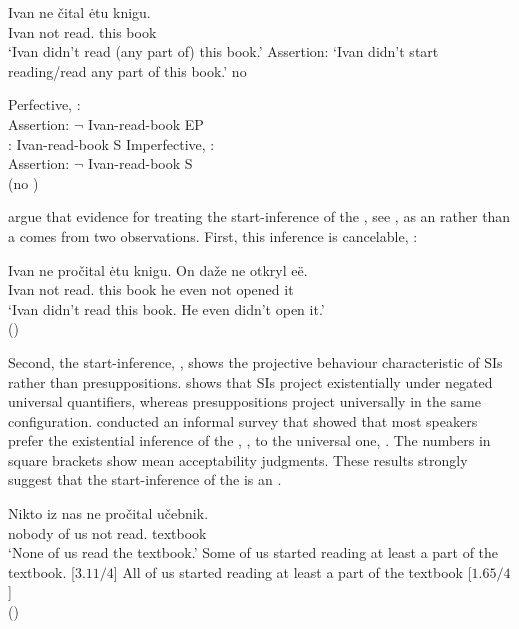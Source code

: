 \documentclass[output=paper,newtxmath,colorlinks,citecolor=brown]{langsci/langscibook}
\begin{document}
 \ea \label{ipfv} \ea \gll Ivan ne čital ėtu knigu. \\
    	Ivan not {read.\im} this book \\
        \glt `Ivan  didn't read (any part of) this book.'
 		\ex  Assertion: `Ivan didn't start reading/read any part of this book.'
        \ex no 
        \z \z

	\ea \label{abbrasp} \ea Perfective, : \\
    	Assertion: $\neg$ Ivan-read-book EP \\
        : Ivan-read-book S
   \ex Imperfective, : \\
        Assertion: $\neg$ Ivan-read-book S \\
        (no )
	\z \z


\noindent \cite{zinfil14} argue that evidence for treating the start-inference of the , see , as an  rather than a  comes from two observations. First, this inference is cancelable, :

\ea \label{cancel} \gll Ivan ne pročital ėtu knigu. On da\v ze ne otkryl e\"e.  \\
    	Ivan not {read.\p} this book he even not opened it\\
       \glt  `Ivan  didn't read this book. He even didn't open it.' \\
        \hfill (\citealt[391]{zinfil14})
	\z

\noindent Second, the start-inference, , shows the projective behaviour characteristic of SIs rather than presuppositions. \cite{che09} shows that SIs project existentially under negated universal quantifiers, whereas presuppositions project universally in the same configuration. \cite{zinfil14} conducted an informal survey that showed that most  speakers prefer  the existential inference of the , , to the universal one, . The numbers in square brackets show mean acceptability judgments. These results strongly suggest that the start-inference of the  is an .

\ea \label{project} \ea \gll Nikto iz nas ne pročital učebnik. \\
        	nobody of us not {read.\p} textbook \\ 			\glt `None of us read the textbook.'
        \ex Some of us started reading at least a part of the textbook. \hfill [$3.11/4$] \label{exist}
    \ex All of us started reading at least a part of the textbook \hfill [$1.65/4$] \label{univ}\\
    \hfill (\citealt[396--398]{zinfil14})
	\z \z
\end{document}
